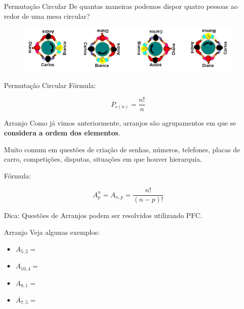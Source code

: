 \documentclass[aspectratio=169,xcolor=dvipsnames]{beamer}
\begin{document}
\begin{frame}{Permutação Circular}
    De quantas maneiras podemos dispor quatro pessoas ao redor de uma mesa circular?

    \begin{figure}[htb!]
      \centering
        \includegraphics[width=.8\linewidth]{images/im4.png}
    \end{figure}

\end{frame}

\begin{frame}{Permutação Circular}
    Fórmula:

    \begin{equation*}
    P_{c(n)} = \dfrac{n!}{n}
    \end{equation*}

\end{frame}

\begin{frame}{Arranjo}
    Como já vimos anteriormente, arranjos são agrupamentos em que se \textbf{considera a ordem dos elementos}.
    \vspace{.5cm}

    Muito comum em questões de criação de senhas, números, telefones, placas de carro, competições, disputas, situações em que houver hierarquia.

    \vspace{.5cm}

    Fórmula:

    \begin{equation*}
        A_p^n = A_{n,p} = \dfrac{n!}{(n-p)!}
    \end{equation*}

    \vspace{.5cm}

    Dica: Questões de Arranjos podem ser resolvidos utilizando PFC.

\end{frame}

\begin{frame}[t]{Arranjo}
    Veja algunas exemplos:

    \vspace{.5cm}

    \begin{itemize}
        \setlength\itemsep{1em}
        \item $A_{5,2} = $
        \item $A_{10,4} = $
        \item $A_{8,1} = $
        \item $A_{7,5} = $
    \end{itemize}

\end{frame}
\end{document}
